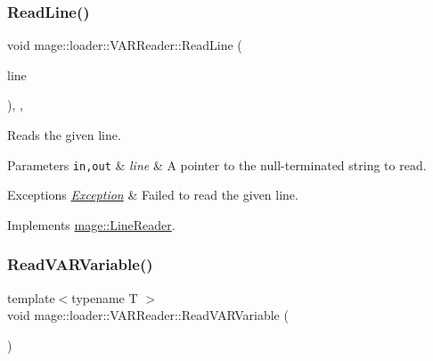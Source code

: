 \subsubsection{\texorpdfstring{Read\+Line()}{ReadLine()}}
{\footnotesize\ttfamily void mage\+::loader\+::\+V\+A\+R\+Reader\+::\+Read\+Line (\begin{DoxyParamCaption}\item[{\mbox{\hyperlink{namespacemage_a8769f9d670d6b585ea306cb1062af94b}{Not\+Null}}$<$ \mbox{\hyperlink{namespacemage_a4163ec9a9a27d5e7f4b452dcb99cb2b9}{zstring}} $>$}]{line }\end{DoxyParamCaption})\hspace{0.3cm}{\ttfamily [override]}, {\ttfamily [private]}, {\ttfamily [virtual]}}

Reads the given line.


\begin{DoxyParams}[1]{Parameters}
\mbox{\tt in,out}  & {\em line} & A pointer to the null-\/terminated string to read. \\
\hline
\end{DoxyParams}

\begin{DoxyExceptions}{Exceptions}
{\em \mbox{\hyperlink{classmage_1_1_exception}{Exception}}} & Failed to read the given line. \\
\hline
\end{DoxyExceptions}


Implements \mbox{\hyperlink{classmage_1_1_line_reader_ae50ac0637eddead37a7a9cca2a570072}{mage\+::\+Line\+Reader}}.

\mbox{\label{classmage_1_1loader_1_1_v_a_r_reader_a253cd885c8527453feedfe619fb684e1}} 
\subsubsection{\texorpdfstring{Read\+V\+A\+R\+Variable()}{ReadVARVariable()}\hspace{0.1cm}{\footnotesize\ttfamily [1/2]}}
{\footnotesize\ttfamily template$<$typename T $>$ \\
void mage\+::loader\+::\+V\+A\+R\+Reader\+::\+Read\+V\+A\+R\+Variable (\begin{DoxyParamCaption}{ }\end{DoxyParamCaption})\hspace{0.3cm}{\ttfamily [private]}}

